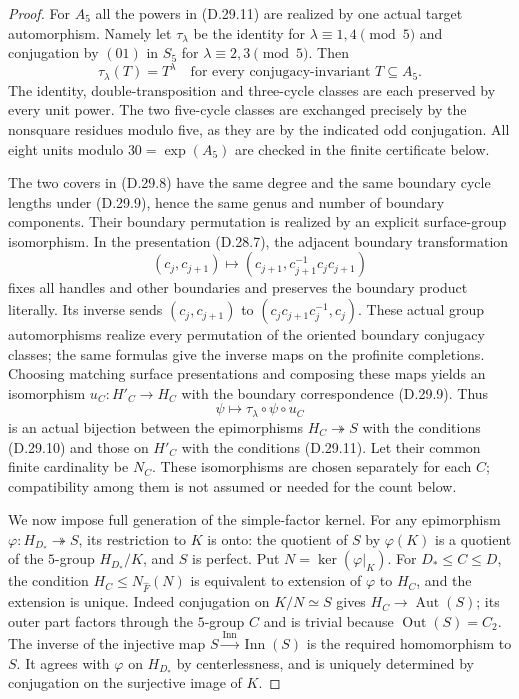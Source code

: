 \begin{proof}
For $A_5$ all the powers in \textup{(D.29.11)} are
realized by one actual target automorphism.  Namely
let $\tau_\lambda$ be the identity for
$\lambda\equiv1,4\pmod5$ and conjugation by $(01)$
in $S_5$ for $\lambda\equiv2,3\pmod5$.
Then
\[
       \tau_\lambda(T)=T^\lambda
       \quad\text{for every conjugacy-invariant }T\subseteq A_5.
 \tag{D.29.12}
\]
The identity, double-transposition and three-cycle
classes are each preserved by every unit power.
The two five-cycle classes are exchanged precisely
by the nonsquare residues modulo five, as they are
by the indicated odd conjugation.  All eight units
modulo $30=\exp(A_5)$ are checked in the finite
certificate below.

The two covers in \textup{(D.29.8)} have the same
degree and the same boundary cycle lengths under
\textup{(D.29.9)}, hence the same genus and number
of boundary components.  Their boundary permutation
is realized by an explicit surface-group isomorphism.
In the presentation \textup{(D.28.7)}, the adjacent
boundary transformation
\[
 (c_j,c_{j+1})\longmapsto
       (c_{j+1},c_{j+1}^{-1}c_jc_{j+1})
 \tag{D.29.13}
\]
fixes all handles and other boundaries and preserves
the boundary product literally.  Its inverse sends
$(c_j,c_{j+1})$ to
$(c_jc_{j+1}c_j^{-1},c_j)$.
These actual group automorphisms realize every
permutation of the oriented boundary conjugacy
classes; the same formulas give the inverse maps
on the profinite completions.
Choosing matching surface presentations and composing
these maps yields an isomorphism
$u_C:H'_C\to H_C$ with the boundary correspondence
\textup{(D.29.9)}.
Thus
\[
                   \psi\longmapsto
                \tau_\lambda\circ\psi\circ u_C
 \tag{D.29.14}
\]
is an actual bijection between the epimorphisms
$H_C\twoheadrightarrow S$ with the conditions
\textup{(D.29.10)} and those on $H'_C$ with the
conditions \textup{(D.29.11)}.
Let their common finite cardinality be $N_C$.
These isomorphisms are chosen separately for each
$C$; compatibility among them is not assumed or
needed for the count below.

We now impose full generation of the simple-factor
kernel.  For any epimorphism
$\varphi:H_{D_*}\twoheadrightarrow S$, its
restriction to $K$ is onto: the quotient of $S$
by $\varphi(K)$ is a quotient of the $5$-group
$H_{D_*}/K$, and $S$ is perfect.
Put $N=\ker(\varphi|_K)$.
For $D_*\leq C\leq D$, the condition
$H_C\leq N_{\widehat F}(N)$ is equivalent to
extension of $\varphi$ to $H_C$, and the extension
is unique.  Indeed conjugation on $K/N\simeq S$
gives $H_C\to\operatorname{Aut}(S)$; its outer
part factors through the $5$-group $C$ and is
trivial because $\operatorname{Out}(S)=C_2$.
The inverse of the injective map
$S\xrightarrow{\operatorname{Inn}}\operatorname{Inn}(S)$
is the required homomorphism to $S$.
It agrees with $\varphi$ on $H_{D_*}$ by
centerlessness, and is uniquely determined by
conjugation on the surjective image of $K$.


\end{proof}
